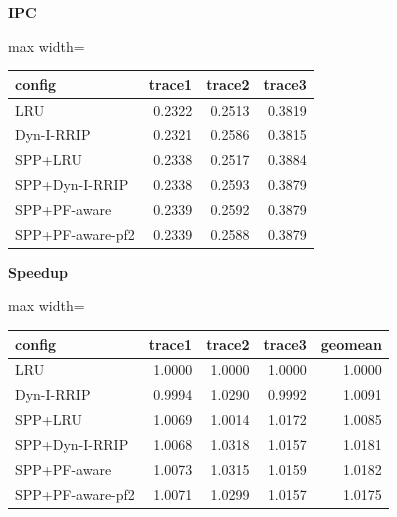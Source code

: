 \documentclass[10pt]{article}
\begin{document}
\begin{center}
\begin{minipage}[t]{0.48\linewidth}\centering
\textbf{IPC}\\[3pt]
\begin{adjustbox}{max width=\linewidth}
\begin{tabular}{@{}lrrr@{}}
\toprule
\textbf{config} & \textbf{trace1} & \textbf{trace2} & \textbf{trace3} \\
\midrule
LRU & 0.2322 & 0.2513 & 0.3819 \\
Dyn-I-RRIP & 0.2321 & 0.2586 & 0.3815 \\
SPP+LRU & 0.2338 & 0.2517 & 0.3884 \\
SPP+Dyn-I-RRIP & 0.2338 & 0.2593 & 0.3879 \\
SPP+PF-aware & 0.2339 & 0.2592 & 0.3879 \\
SPP+PF-aware-pf2 & 0.2339 & 0.2588 & 0.3879 \\
\bottomrule
\end{tabular}
\end{adjustbox}
\end{minipage}\hfill
\begin{minipage}[t]{0.48\linewidth}\centering
\textbf{Speedup}\\[3pt]
\begin{adjustbox}{max width=\linewidth}
\begin{tabular}{@{}lrrrr@{}}
\toprule
\textbf{config} & \textbf{trace1} & \textbf{trace2} & \textbf{trace3} & \textbf{geomean} \\
\midrule
LRU & 1.0000 & 1.0000 & 1.0000 & 1.0000 \\
Dyn-I-RRIP & 0.9994 & 1.0290 & 0.9992 & 1.0091 \\
SPP+LRU & 1.0069 & 1.0014 & 1.0172 & 1.0085 \\
SPP+Dyn-I-RRIP & 1.0068 & 1.0318 & 1.0157 & 1.0181 \\
SPP+PF-aware & 1.0073 & 1.0315 & 1.0159 & 1.0182 \\
SPP+PF-aware-pf2 & 1.0071 & 1.0299 & 1.0157 & 1.0175 \\
\bottomrule
\end{tabular}
\end{adjustbox}
\end{minipage}
\end{center}
\medskip
\end{document}
